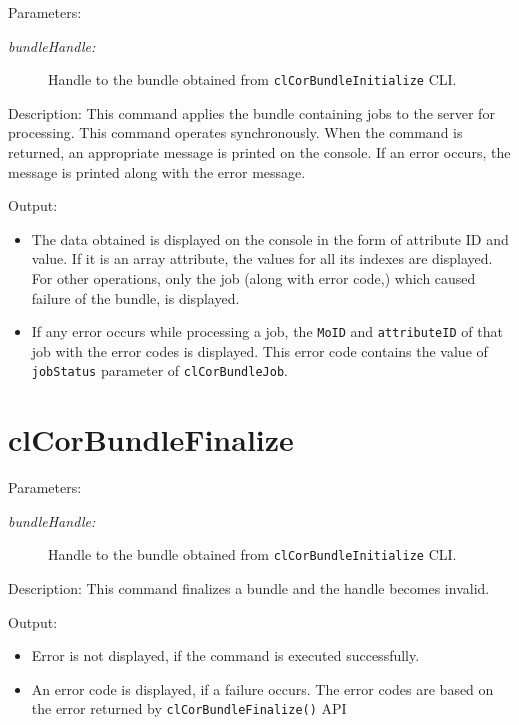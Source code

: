 \begin{flushleft}
\begin{Desc}
\item
[Parameters:] 
\begin{description}
\item[{\em bundle\-Handle:}] Handle to the bundle obtained from {\tt{clCorBundleInitialize}} CLI.
\end{description}
\end{Desc}
\begin{Desc}
\item
[Description:]
This command applies the bundle containing jobs to the server for processing.
This command operates synchronously. When the command is returned, an appropriate message is printed on the console. If an error occurs, the message
is printed along with the error message.
\end{Desc}
\begin{Desc}
\item
[Output:]
\begin{itemize}
\item
The data obtained is displayed on the console in the form of attribute ID and value. If it is an array attribute, the values for all its indexes are 
displayed. For other operations, only the job (along with error code,) which caused failure of the bundle, is displayed.
\item
If any error occurs while processing a job, the {\tt{MoID}} and {\tt{attributeID}} of that job with the error codes is displayed. This error code 
contains the value of {\tt{jobStatus}} parameter of {\tt{clCorBundleJob}}.\end{itemize}
\end{Desc}



\section{clCorBundleFinalize}
\begin{Desc}
\item
[Parameters:] 
\begin{description}
\item[{\em bundle\-Handle:}] Handle to the bundle obtained from {\tt{clCorBundleInitialize}} CLI.
\end{description}
\end{Desc}
\begin{Desc}
\item
[Description:] 
This command finalizes a bundle and the handle becomes invalid.
\end{Desc}
\begin{Desc}
\item
[Output:] 
\begin{itemize}
\item Error is not displayed, if the command is executed successfully.
\item An error code is displayed, if a failure occurs. The error codes are based on the error returned by {\tt{clCorBundleFinalize()}} API
\end{itemize}
\end{Desc}



\end{flushleft}

